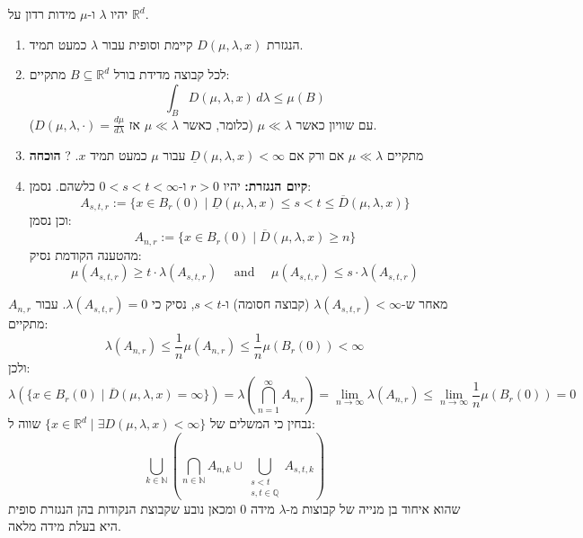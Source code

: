 \documentclass{tstextbook}
\begin{document}
\begin{theorem}
יהיו \(\lambda\) ו-\(\mu\) מידות רדון על \(\mathbb{R}^d\).

  \begin{enumerate}
    \item הנגזרת \(D(\mu, \lambda, x)\) קיימת וסופית עבור \(\lambda\) כמעט תמיד. 


    \item לכל קבוצה מדידת בורל \(B \subseteq \mathbb{R}^d\) מתקיים: 
$$ \int_B D(\mu, \lambda, x) \, d\lambda \leq \mu(B) $$
עם שוויון כאשר \(\mu \ll \lambda\) (כלומר, כאשר \(\mu \ll \lambda\) אז \(D(\mu, \lambda, \cdot) = \frac{d\mu}{d\lambda}\)).


    \item מתקיים \(\mu \ll \lambda\) אם ורק אם \(\underline{D}(\mu, \lambda, x) < \infty\) עבור \(\mu\) כמעט תמיד \(x\). 
?
\textbf{הוכחה}


    \item \textbf{קיום הנגזרת:} 
יהיו \(r > 0\) ו-\(0 < s < t < \infty\) כלשהם. נסמן:
$$ A_{s,t,r} := \{x \in B_r(0) \mid \underline{D}(\mu, \lambda, x) \leq s < t \leq \overline{D}(\mu, \lambda, x)\} $$
וכן נסמן:
$$ A_{n,r} := \{x \in B_r(0) \mid \overline{D}(\mu, \lambda, x) \geq n\} $$
מהטענה הקודמת נסיק:
$$ \mu(A_{s,t,r}) \geq t \cdot \lambda(A_{s,t,r}) \quad \text{ and }\quad  \mu(A_{s,t,r}) \leq s \cdot \lambda(A_{s,t,r}) $$


  \end{enumerate}
\end{theorem}
מאחר ש-\(\lambda(A_{s,t,r}) < \infty\) (קבוצה חסומה) ו-\(s < t\), נסיק כי \(\lambda(A_{s,t,r}) = 0\). עבור \(A_{n,r}\) מתקיים:
$$ \lambda(A_{n,r}) \leq \frac{1}{n} \mu(A_{n,r}) \leq \frac{1}{n} \mu(B_r(0)) < \infty $$
ולכן:
$$ \lambda(\{x \in B_r(0) \mid \overline{D}(\mu, \lambda, x) = \infty\}) = \lambda\left( \bigcap_{n=1}^\infty A_{n,r} \right) = \lim_{n \to \infty} \lambda(A_{n,r}) \leq \lim_{n \to \infty} \frac{1}{n} \mu(B_r(0)) = 0 $$
נבחין כי המשלים של \(\{x \in \mathbb{R}^d \mid \exists D(\mu, \lambda, x) < \infty\}\) שווה ל:
$$ \bigcup_{k \in \mathbb{N}} \left( \bigcap_{n \in \mathbb{N}} A_{n,k} \cup \bigcup_{\substack{s < t \\ s,t \in \mathbb{Q}}} A_{s,t,k} \right) $$
שהוא איחוד בן מנייה של קבוצות מ-\(\lambda\) מידה 0 ומכאן נובע שקבוצת הנקודות בהן הנגזרת סופית היא בעלת מידה מלאה.
\end{document}
